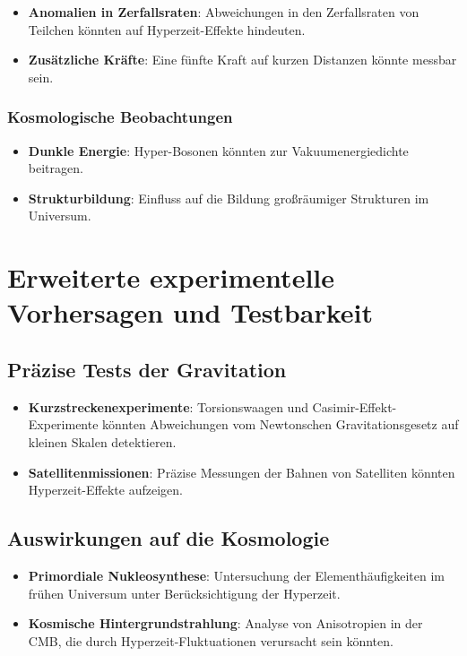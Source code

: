 \documentclass[11pt,a4paper]{article}
\begin{document}
\begin{itemize}
    \item \textbf{Anomalien in Zerfallsraten}: Abweichungen in den Zerfallsraten von Teilchen könnten auf Hyperzeit-Effekte hindeuten.
    \item \textbf{Zusätzliche Kräfte}: Eine fünfte Kraft auf kurzen Distanzen könnte messbar sein.
\end{itemize}

\subsubsection{Kosmologische Beobachtungen}

\begin{itemize}
    \item \textbf{Dunkle Energie}: Hyper-Bosonen könnten zur Vakuumenergiedichte beitragen.
    \item \textbf{Strukturbildung}: Einfluss auf die Bildung großräumiger Strukturen im Universum.
\end{itemize}

\section{Erweiterte experimentelle Vorhersagen und Testbarkeit}

\subsection{Präzise Tests der Gravitation}

\begin{itemize}
    \item \textbf{Kurzstreckenexperimente}: Torsionswaagen und Casimir-Effekt-Experimente könnten Abweichungen vom Newtonschen Gravitationsgesetz auf kleinen Skalen detektieren.
    \item \textbf{Satellitenmissionen}: Präzise Messungen der Bahnen von Satelliten könnten Hyperzeit-Effekte aufzeigen.
\end{itemize}

\subsection{Auswirkungen auf die Kosmologie}

\begin{itemize}
    \item \textbf{Primordiale Nukleosynthese}: Untersuchung der Elementhäufigkeiten im frühen Universum unter Berücksichtigung der Hyperzeit.
    \item \textbf{Kosmische Hintergrundstrahlung}: Analyse von Anisotropien in der CMB, die durch Hyperzeit-Fluktuationen verursacht sein könnten.
\end{itemize}
\end{document}
